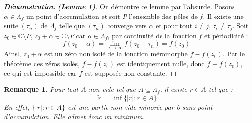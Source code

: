 \documentclass[12pt]{article}
\newtheorem{remark}{Remarque}
\begin{document}
\begin{proof}[\textbf{Démonstration (Lemme 1)}]
On démontre ce lemme par l'absurde. Posons \( \alpha \in \Lambda_f \) un point d'accumulation et soit \( P \) l'ensemble des pôles de \( f \). Il existe une suite \( (\tau_n) \) de \( \Lambda_f \) telle que \( (\tau_n) \) converge vers \( \alpha \) et pour tout \( i \neq j \), \( \tau_i \neq \tau_j \). Soit \( z_0 \in \mathbb{C}\setminus P \), \( z_0 + \alpha \in \mathbb{C}\setminus P \) car \( \alpha \in \Lambda_f \), par continuité de la fonction \( f \) et périodicité :
\[
f(z_0 + \alpha) = \lim_{n \to \infty} f(z_0 + \tau_n) = f(z_0)
\]
Ainsi, \( z_0 + \alpha \) est un zéro non isolé de la fonction méromorphe \( f - f(z_0) \). Par le théorème des zéros isolés, \( f - f(z_0) \) est identiquement nulle, donc \( f \equiv f(z_0) \), ce qui est impossible car \( f \) est supposée non constante.
\end{proof}
\begin{remark}
    Pour tout \( A \) non vide tel que \( A \subseteq \Lambda_f \), il existe \( \tilde{r} \in A \) tel que :
    \[
    |\tilde{r}| = \inf\{|r| : r \in A\}
    \]
    En effet, $ \{|r| : r \in A\} $ est une partie non vide minorée par 0 sans point d'accumulation. Elle admet donc un minimum.
\end{remark}
\end{document}
